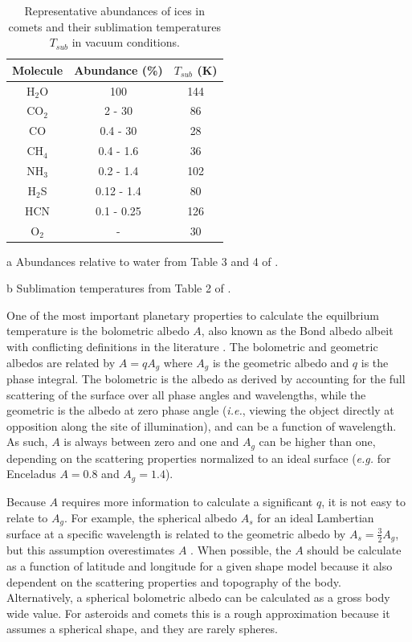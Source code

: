 \documentclass[a4paper,fleqn,usenatbib]{mnras}
\begin{document}
\begin{table}
\centering
\begin{threeparttable}
\centering
\caption{Representative abundances of ices in comets and their sublimation temperatures $T_{sub}$ in vacuum conditions.}
\begin{tabular}{ c c c }
 \hline
 \hline
	Molecule & Abundance (\%)\tnote{a} & $T_{sub}$ (K)\tnote{b} \\
 \hline
	H$_2$O & 100 & 144 \\
	CO$_2$ & 2 - 30 & 86 \\
	CO & 0.4 - 30 & 28 \\
	CH$_4$ & 0.4 - 1.6 & 36 \\
	NH$_3$ & 0.2 - 1.4 & 102 \\
	H$_2$S & 0.12 - 1.4 & 80 \\
	HCN & 0.1 - 0.25 & 126 \\
	O$_2$ & - & 30 \\
 \hline
 \hline
\end{tabular}
\label{tab:ices}
	\begin{tablenotes}
	\small
\item[a]{Abundances relative to water from Table 3 and 4 of \citet{2011ARA&A..49..471M}.}
\item[b]{Sublimation temperatures from Table 2 of \citet{2017MNRAS.469S.108G}.}
	\end{tablenotes}
\end{threeparttable}
\end{table}

One of the most important planetary properties to calculate the equilbrium temperature is the bolometric albedo $A$, also known as the Bond albedo albeit with conflicting definitions in the literature \citep{1916PNAS....2...74R, 1981A&A...104...42H, 1999PCEC...24..573G,2016AJ....152..209M}. The bolometric and geometric albedos are related by $A = qA_g$ where $A_g$ is the geometric albedo and $q$ is the phase integral. The bolometric is the albedo as derived by accounting for the full scattering of the surface over all phase angles and wavelengths, while the geometric is the albedo at zero phase angle (\emph{i.e.}, viewing the object directly at opposition along the site of illumination), and can be a function of wavelength. As such, $A$ is always between zero and one and $A_g$ can be higher than one, depending on the scattering properties normalized to an ideal surface (\emph{e.g.} for Enceladus $A=0.8$ and $A_g=1.4$).

Because $A$ requires more information to calculate a significant $q$, it is not easy to relate to $A_g$. For example, the spherical albedo $A_s$ for an ideal Lambertian surface at a specific wavelength is related to the geometric albedo by $A_s=\frac{3}{2}A_g$, but this assumption overestimates $A$ \citep{2016ApJ...822...76D}. When possible, the $A$ should be calculate as a function of latitude and longitude for a given shape model because it also dependent on the scattering properties and topography of the body. Alternatively, a spherical bolometric albedo can be calculated as a gross body wide value. For asteroids and comets this is a rough approximation because it assumes a spherical shape, and they are rarely spheres.
\end{document}
